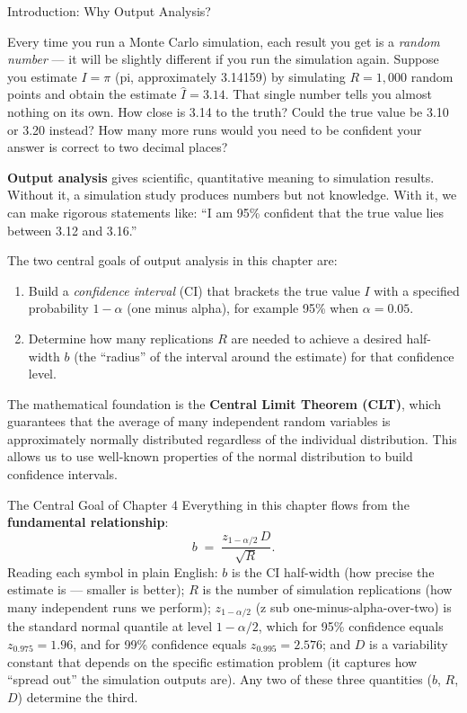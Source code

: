 \documentclass[aspectratio=169,10pt]{beamer}
\begin{document}
\begin{frame}[allowframebreaks]{Introduction: Why Output Analysis?}

Every time you run a Monte Carlo simulation, each result you get is a
\emph{random number} --- it will be slightly different if you run the
simulation again.  Suppose you estimate $I = \pi$ (pi, approximately
3.14159) by simulating $R = 1{,}000$ random points and obtain the
estimate $\hat{I} = 3.14$.  That single number tells you almost nothing
on its own.  How close is 3.14 to the truth?  Could the true value be
3.10 or 3.20 instead?  How many more runs would you need to be confident
your answer is correct to two decimal places?

\textbf{Output analysis} gives scientific, quantitative meaning to
simulation results.  Without it, a simulation study produces numbers but
not knowledge.  With it, we can make rigorous statements like:
``I am 95\% confident that the true value lies between 3.12 and 3.16.''

The two central goals of output analysis in this chapter are:
\begin{enumerate}
  \item Build a \emph{confidence interval} (CI) that brackets the true
        value $I$ with a specified probability $1 - \alpha$ (one minus
        alpha), for example 95\% when $\alpha = 0.05$.
  \item Determine how many replications $R$ are needed to achieve a
        desired half-width $b$ (the ``radius'' of the interval around
        the estimate) for that confidence level.
\end{enumerate}

The mathematical foundation is the \textbf{Central Limit Theorem (CLT)},
which guarantees that the average of many independent random variables
is approximately normally distributed regardless of the individual
distribution.  This allows us to use well-known properties of the
normal distribution to build confidence intervals.

\begin{block}{The Central Goal of Chapter 4}
  Everything in this chapter flows from the \textbf{fundamental
  relationship}:
  \[
    b \;=\; \frac{z_{1-\alpha/2}\,D}{\sqrt{R}}.
  \]
  Reading each symbol in plain English: $b$ is the CI half-width
  (how precise the estimate is --- smaller is better); $R$ is the number
  of simulation replications (how many independent runs we perform);
  $z_{1-\alpha/2}$ (z sub one-minus-alpha-over-two) is the standard
  normal quantile at level $1 - \alpha/2$, which for 95\% confidence
  equals $z_{0.975} = 1.96$, and for 99\% confidence equals
  $z_{0.995} = 2.576$; and $D$ is a variability constant that depends
  on the specific estimation problem (it captures how ``spread out'' the
  simulation outputs are).  Any two of these three quantities ($b$, $R$,
  $D$) determine the third.
\end{block}


\end{frame}
\end{document}
